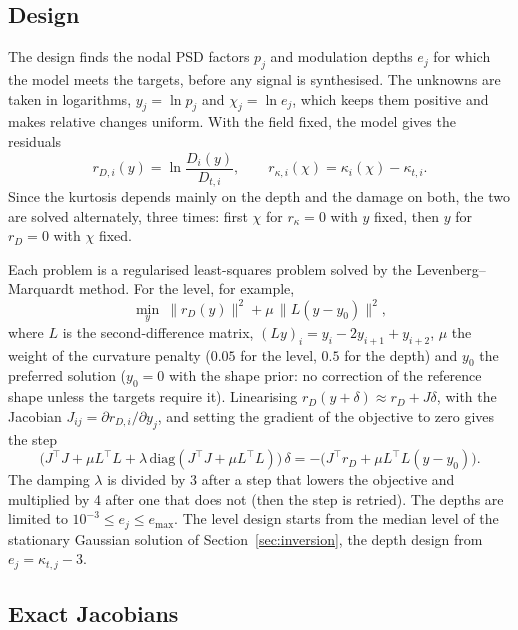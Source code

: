 \subsection{Design}\label{sec:design}

The design finds the nodal PSD factors $p_j$ and modulation depths $e_j$ for which the model meets the
targets, before any signal is synthesised. The unknowns are taken in logarithms, $y_j = \ln p_j$ and
$\chi_j = \ln e_j$, which keeps them positive and makes relative changes uniform. With the field
fixed, the model gives the residuals
\begin{equation}
  r_{D,i}(y) = \ln\frac{D_i(y)}{D_{t,i}}, \qquad r_{\kappa,i}(\chi) = \kappa_i(\chi) - \kappa_{t,i}.
\end{equation}
Since the kurtosis depends mainly on the depth and the damage on both, the two are solved
alternately, three times: first $\chi$ for $r_\kappa = 0$ with $y$ fixed, then $y$ for $r_D=0$ with
$\chi$ fixed.

Each problem is a regularised least-squares problem solved by the Levenberg--Marquardt method. For the
level, for example,
\begin{equation}
  \min_y\ \|r_D(y)\|^2 + \mu\,\|L(y - y_0)\|^2 ,
\end{equation}
where $L$ is the second-difference matrix, $(Ly)_i = y_i - 2y_{i+1} + y_{i+2}$, $\mu$ the weight of
the curvature penalty ($0.05$ for the level, $0.5$ for the depth) and $y_0$ the preferred solution
($y_0=0$ with the shape prior: no correction of the reference shape unless the targets require it).
Linearising $r_D(y+\delta) \approx r_D + J\delta$, with the Jacobian $J_{ij} = \partial r_{D,i}/\partial
y_j$, and setting the gradient of the objective to zero gives the step
\begin{equation}
  \bigl(J^{\top}J + \mu L^{\top}L + \lambda\,\mathrm{diag}(J^{\top}J+\mu L^{\top}L)\bigr)\,\delta
  = -\bigl(J^{\top}r_D + \mu L^{\top}L(y-y_0)\bigr).
\end{equation}
The damping $\lambda$ is divided by 3 after a step that lowers the objective and multiplied by 4 after
one that does not (then the step is retried). The depths are limited to $10^{-3}\le e_j\le e_{\max}$.
The level design starts from the median level of the stationary Gaussian solution of
Section~\ref{sec:inversion}, the depth design from $e_j = \kappa_{t,j}-3$.

\subsection{Exact Jacobians}\label{sec:jacobians}

